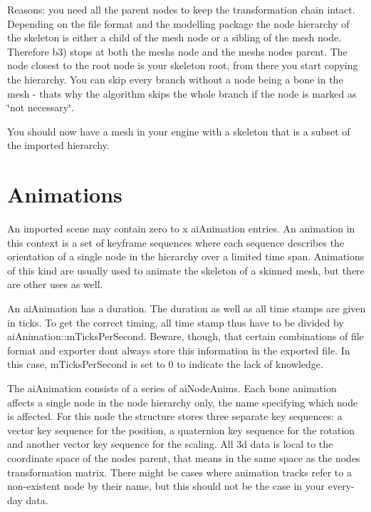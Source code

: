 Reasons\+: you need all the parent nodes to keep the transformation chain intact. Depending on the file format and the modelling package the node hierarchy of the skeleton is either a child of the mesh node or a sibling of the mesh node. Therefore b3) stops at both the mesh\textquotesingle{}s node and the mesh\textquotesingle{}s node\textquotesingle{}s parent. The node closest to the root node is your skeleton root, from there you start copying the hierarchy. You can skip every branch without a node being a bone in the mesh -\/ that\textquotesingle{}s why the algorithm skips the whole branch if the node is marked as \char`\"{}not necessary\char`\"{}.

You should now have a mesh in your engine with a skeleton that is a subset of the imported hierarchy.\hypertarget{data_anims}{}\section{Animations}\label{data_anims}
An imported scene may contain zero to x ai\+Animation entries. An animation in this context is a set of keyframe sequences where each sequence describes the orientation of a single node in the hierarchy over a limited time span. Animations of this kind are usually used to animate the skeleton of a skinned mesh, but there are other uses as well.

An ai\+Animation has a duration. The duration as well as all time stamps are given in ticks. To get the correct timing, all time stamp thus have to be divided by ai\+Animation\+::m\+Ticks\+Per\+Second. Beware, though, that certain combinations of file format and exporter don\textquotesingle{}t always store this information in the exported file. In this case, m\+Ticks\+Per\+Second is set to 0 to indicate the lack of knowledge.

The ai\+Animation consists of a series of ai\+Node\+Anim\textquotesingle{}s. Each bone animation affects a single node in the node hierarchy only, the name specifying which node is affected. For this node the structure stores three separate key sequences\+: a vector key sequence for the position, a quaternion key sequence for the rotation and another vector key sequence for the scaling. All 3d data is local to the coordinate space of the node\textquotesingle{}s parent, that means in the same space as the node\textquotesingle{}s transformation matrix. There might be cases where animation tracks refer to a non-\/existent node by their name, but this should not be the case in your every-\/day data.

